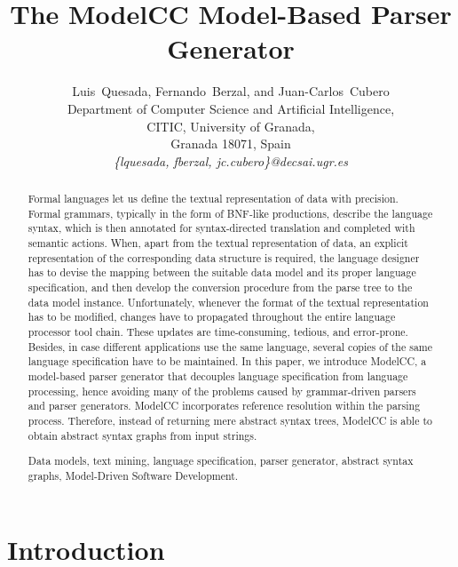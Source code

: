 \documentclass[preprint]{elsarticle}
\begin{document}
\title{The ModelCC Model-Based Parser Generator}

\author{Luis~Quesada, Fernando~Berzal, and Juan-Carlos~Cubero\\
  Department of Computer Science and Artificial Intelligence, \\
  CITIC, University of Granada, \\ 
  Granada 18071, Spain \\
  \textit{\{lquesada, fberzal, jc.cubero\}@decsai.ugr.es}
  }

\begin{abstract}

Formal languages let us define the textual representation of data with precision.
Formal grammars, typically in the form of BNF-like productions, describe the language syntax, which is then annotated for syntax-directed translation and completed with semantic actions.
When, apart from the textual representation of data, an explicit representation of the corresponding data structure is required, the language designer has to devise the mapping between the suitable data model and its proper language specification, and then develop the conversion procedure from the parse tree to the data model instance.
Unfortunately, whenever the format of the textual representation has to be modified, changes have to propagated throughout the entire language processor tool chain.
These updates are time-consuming, tedious, and error-prone.
Besides, in case different applications use the same language, several copies of the same language specification have to be maintained.
In this paper, we introduce ModelCC, a model-based parser generator that decouples language specification from language processing, hence avoiding many of the problems caused by grammar-driven parsers and parser generators.
ModelCC incorporates reference resolution within the parsing process.
Therefore, instead of returning mere abstract syntax trees, ModelCC is able to obtain abstract syntax graphs from input strings.

 Data models, text mining, language specification, parser generator, abstract syntax graphs, Model-Driven Software Development.

\end{abstract}

\maketitle

\section{Introduction}
\end{document}
